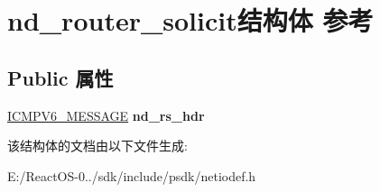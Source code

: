 \hypertarget{structnd__router__solicit}{}\section{nd\+\_\+router\+\_\+solicit结构体 参考}
\label{structnd__router__solicit}
\subsection*{Public 属性}
\begin{DoxyCompactItemize}
\item 
\mbox{\label{structnd__router__solicit_afa2f74a88fc8194277dad59cd3d01969}} 
\hyperlink{struct___i_c_m_p___m_e_s_s_a_g_e}{I\+C\+M\+P\+V6\+\_\+\+M\+E\+S\+S\+A\+GE} {\bfseries nd\+\_\+rs\+\_\+hdr}
\end{DoxyCompactItemize}


该结构体的文档由以下文件生成\+:\begin{DoxyCompactItemize}
\item 
E\+:/\+React\+O\+S-\/0../sdk/include/psdk/netiodef.\+h\end{DoxyCompactItemize}
